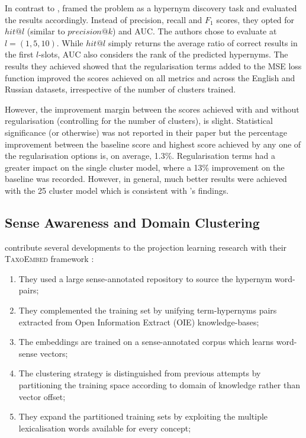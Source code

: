 In contrast to \citep{Fu2014}, \citeauthor{ustalov2017negative} framed the problem as a hypernym discovery task and evaluated the results accordingly.  Instead of precision, recall and $F_1$ scores, they opted for $hit@l$ (similar to $precision@k$) and \ac{AUC}.  The authors chose to evaluate at $l=(1, 5, 10)$.  While $hit@l$ simply returns the average ratio of correct results in the first $l$-slots, \ac{AUC} also considers the rank of the predicted hypernyms.  The results they achieved showed that the regularisation terms added to the \ac{MSE} loss function improved the scores achieved on all metrics and across the English and Russian datasets, irrespective of the number of clusters trained.  

However, the improvement margin between the scores achieved with and without regularisation (controlling for the number of clusters), is slight.  Statistical significance (or otherwise) was not reported in their paper but the percentage improvement between the baseline score and highest score achieved by any one of the regularisation options is, on average, 1.3\%.  Regularisation terms had a greater impact on the single cluster model, where a 13\% improvement on the baseline was recorded.  However, in general, much better results were achieved with the 25 cluster model which is consistent with \citeauthor{Fu2014}'s findings.

\subsection{Sense Awareness and Domain Clustering}
\citeauthor{espinosa2016supervised} contribute several developments to the projection learning research with their \textsc{TaxoEmbed} framework \citep{espinosa2016supervised}:
\begin{enumerate}
    \item They used a large sense-annotated repository to source the hypernym word-pairs; 
    \item They complemented the training set by unifying term-hypernyms pairs extracted from Open Information Extract (OIE) knowledge-bases;
    \item The embeddings are trained on a sense-annotated corpus which learns word-sense vectors;
    \item The clustering strategy is distinguished from previous attempts by partitioning the training space according to domain of knowledge rather than vector offset;
    \item They expand the partitioned training sets by exploiting the multiple lexicalisation words available for every concept;
\end{enumerate}

